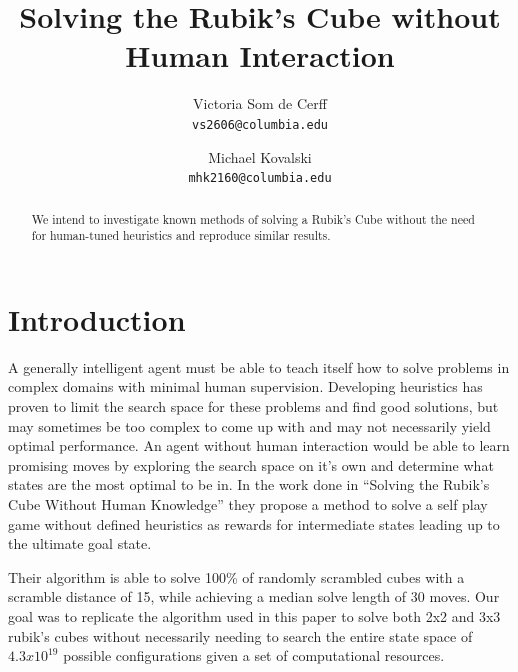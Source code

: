 \documentclass[10pt,twocolumn,letterpaper]{article}
\begin{document}
\title{Solving the Rubik's Cube without Human Interaction}

\author{Victoria Som de Cerff\\
{\tt\small vs2606@columbia.edu}
\and
Michael Kovalski\\
{\tt\small mhk2160@columbia.edu}
}

\maketitle

\begin{abstract}
We intend to investigate known methods of solving a Rubik's Cube without the need for human-tuned heuristics and reproduce similar results. 
\end{abstract}

\section{Introduction}

A generally intelligent agent must be able to teach itself how to solve problems in complex domains with minimal human supervision.  Developing heuristics has proven to limit the search space for these problems and find good solutions, but may sometimes be too complex to come up with and may not necessarily yield optimal performance. An agent without human interaction would be able to learn promising moves by exploring the search space on it’s own and determine what states are the most optimal to be in. In the work done in “Solving the Rubik’s Cube Without Human Knowledge” they propose a method to solve a self play game without defined heuristics as rewards for intermediate states leading up to the ultimate goal state.  

Their algorithm is able to solve 100\% of randomly scrambled cubes with a scramble distance of 15, while achieving a median solve length of 30 moves. Our goal was to replicate the algorithm used in this paper to solve both 2x2 and 3x3 rubik's cubes without necessarily needing to  search the entire state space of $4.3 x 10^{19}$ possible configurations given a set of computational resources.
\end{document}
